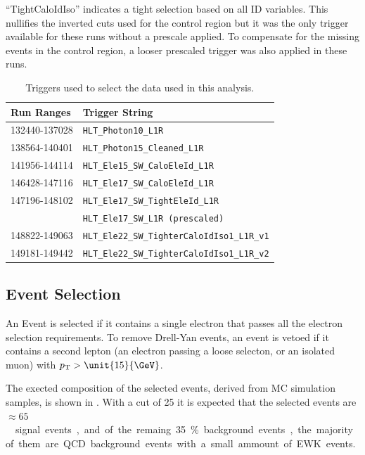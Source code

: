 ``TightCaloIdIso'' indicates a tight selection based on all ID variables. 
This nullifies the inverted cuts used for the control region but
it was the only trigger available for these runs without a prescale applied.
To compensate for the missing events in the control region, a looser prescaled
trigger was also applied in these runs.

\begin{table}[htbp]
  \centering
  \begin{tabular}{ l l }
    \toprule
    Run Ranges & Trigger String\\
    \midrule
    132440-137028 & \verb=HLT_Photon10_L1R= \\
    138564-140401 & \verb=HLT_Photon15_Cleaned_L1R= \\
    141956-144114 & \verb=HLT_Ele15_SW_CaloEleId_L1R= \\
    146428-147116 & \verb=HLT_Ele17_SW_CaloEleId_L1R= \\
    147196-148102 & \verb=HLT_Ele17_SW_TightEleId_L1R= \\
                  & \verb=HLT_Ele17_SW_L1R (prescaled)= \\ 
    148822-149063 & \verb=HLT_Ele22_SW_TighterCaloIdIso1_L1R_v1= \\
    149181-149442 & \verb=HLT_Ele22_SW_TighterCaloIdIso1_L1R_v2= \\
    \bottomrule
  \end{tabular}
  \caption{Triggers used to select the data used in this analysis.}
  \label{asym36:triggers}
\end{table}

\subsection{Event Selection}
An Event is selected if it contains a single electron that passes all the electron
selection requirements.
To remove Drell-Yan events, an event is vetoed if it contains a second lepton
(an electron passing a loose selecton, or an isolated muon) with $\PT > 
\unit{15}{\GeV}$.

The exected composition of the selected events, derived from MC simulation
samples, is shown in . With a \pT cut of
\unit{25}{\GeV} it is expected that the selected events are \unit{$\approx
65$}{\GeV} signal events, and of the remaing \unit{35}{\%} background events, the
majority of them are \ac{QCD} background events with a small ammount of \ac{EWK}
events. 

